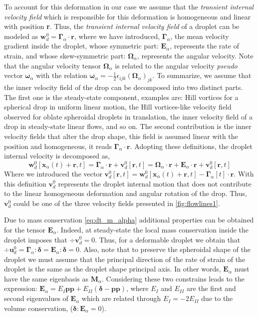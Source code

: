 To account for this deformation in our case we assume that the \textit{transient internal velocity field} which is responsible for this deformation is homogeneous and linear with position \textbf{r}. 
Thus, the \textit{transient internal velocity field} of a droplet can be modeled as $\textbf{w}_d^0 = \bm\Gamma_\alpha \cdot \textbf{r}$, where we have introduced, $\bm\Gamma_\alpha$, the mean velocity gradient inside the droplet, whose symmetric part: $\textbf{E}_\alpha$, represents the rate of strain, and whose skew-symmetric part: $\bm\Omega_\alpha$, represents the angular velocity. 
Note that the angular velocity tensor $\bm\Omega_\alpha$ is related to the angular velocity \textit{pseudo} vector $\bm\omega_\alpha$ with the relation $\bm\omega_\alpha = -\frac{1}{2}\epsilon_{ijk} (\bm\Omega_\alpha)_{jk}$. 
To summarize, we assume that the inner velocity field of the drop can be decomposed into two distinct parts. 
The first one is the steady-state component, examples are: Hill vortices for a spherical drop in uniform linear motion, the Hill vortices-like velocity field observed for oblate spheroidal droplets in translation,  the inner velocity field of a drop in steady-state linear flows, and so on.  
The second contribution is the inner velocity fields that alter the drop shape, this field is assumed linear with the position and homogeneous, it reads  $\bm\Gamma_\alpha\cdot \textbf{r}$. 
Adopting these definitions, the droplet internal velocity is decomposed as, 
\begin{equation}
    \textbf{w}_{d}^0[\textbf{x}_\alpha(t)+\textbf{r},t]
    = \bm\Gamma_{\alpha} \cdot \textbf{r}
    + \textbf{v}^0_{d}[\textbf{r},t]
    =\bm{\Omega}_{\alpha}\cdot \textbf{r}
    + \textbf{E}_{\alpha} \cdot \textbf{r}
    + \textbf{v}^0_{d}[\textbf{r},t]
    \label{eq:def_vel}
\end{equation}
Where we introduced the vector $\textbf{v}^0_d[\textbf{r},t] =\textbf{w}^{0}_{d}[\textbf{x}_\alpha(t)+\textbf{r},t]  - \bm\Gamma_{\alpha}[t] \cdot \textbf{r}$.
With this definition $\textbf{v}_d^0$ represents the droplet internal motion that does not contribute to the linear homogeneous deformation and angular rotation of the drop. 
Thus, $\textbf{v}_d^0$ could be one of the three velocity fields presented in \ref{fig:flowlines1}. 

Due to mass conservation \eqref{eq:dt_m_alpha} additional properties can be obtained for the tensor $\textbf{E}_\alpha$.
Indeed, at steady-state the local mass conservation inside the droplet imposes that $\div \textbf{v}_d^0 = 0$. 
Thus, for a deformable droplet we obtain that $\div \textbf{u}_d^0 = \bm\Gamma_\alpha : \bm\delta = \textbf{E}_\alpha : \bm\delta =  0$.  
Also, note that to preserve the spheroidal shape of the droplet we must assume that the principal direction of the rate of strain of the droplet is the same as the droplet shape principal axis. 
In other words, $\textbf{E}_\alpha$ must have the same eigenbasis as $\textbf{M}_\alpha$. 
Considering these two constrains leads to the expression: $\textbf{E}_\alpha = E_I \textbf{pp} + E_{II} (\bm\delta - \textbf{pp})$, where $E_I$ and $E_{II}$ are the first and second eigenvalues of $\textbf{E}_\alpha$ which are related through $E_I = - 2E_{II}$ due to the volume conservation, ($\bm\delta : \textbf{E}_\alpha =0$). 


